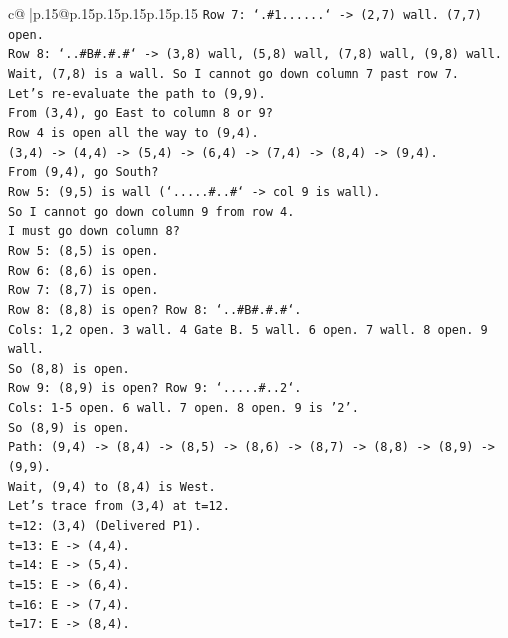 \documentclass{article}
\begin{document}
{\begin{supertabular}{c@{$\;$}|p{.15\linewidth}@{}p{.15\linewidth}p{.15\linewidth}p{.15\linewidth}p{.15\linewidth}p{.15\linewidth}}
{{{\texttt{Row 7: `.\#1......` {-}> (2,7) wall. (7,7) open.} \\
\texttt{Row 8: `..\#B\#.\#.\#` {-}> (3,8) wall, (5,8) wall, (7,8) wall, (9,8) wall.} \\
\texttt{Wait, (7,8) is a wall. So I cannot go down column 7 past row 7.} \\
\texttt{Let's re{-}evaluate the path to (9,9).} \\
\texttt{From (3,4), go East to column 8 or 9?} \\
\texttt{Row 4 is open all the way to (9,4).} \\
\texttt{(3,4) {-}> (4,4) {-}> (5,4) {-}> (6,4) {-}> (7,4) {-}> (8,4) {-}> (9,4).} \\
\texttt{From (9,4), go South?} \\
\texttt{Row 5: (9,5) is wall (`.....\#..\#` {-}> col 9 is wall).} \\
\texttt{So I cannot go down column 9 from row 4.} \\
\texttt{I must go down column 8?} \\
\texttt{Row 5: (8,5) is open.} \\
\texttt{Row 6: (8,6) is open.} \\
\texttt{Row 7: (8,7) is open.} \\
\texttt{Row 8: (8,8) is open? Row 8: `..\#B\#.\#.\#`.} \\
\texttt{Cols: 1,2 open. 3 wall. 4 Gate B. 5 wall. 6 open. 7 wall. 8 open. 9 wall.} \\
\texttt{So (8,8) is open.} \\
\texttt{Row 9: (8,9) is open? Row 9: `.....\#..2`.} \\
\texttt{Cols: 1{-}5 open. 6 wall. 7 open. 8 open. 9 is '2'.} \\
\texttt{So (8,9) is open.} \\
\texttt{Path: (9,4) {-}> (8,4) {-}> (8,5) {-}> (8,6) {-}> (8,7) {-}> (8,8) {-}> (8,9) {-}> (9,9).} \\
\texttt{Wait, (9,4) to (8,4) is West.} \\
\texttt{Let's trace from (3,4) at t=12.} \\
\texttt{t=12: (3,4) (Delivered P1).} \\
\texttt{t=13: E {-}> (4,4).} \\
\texttt{t=14: E {-}> (5,4).} \\
\texttt{t=15: E {-}> (6,4).} \\
\texttt{t=16: E {-}> (7,4).} \\
\texttt{t=17: E {-}> (8,4).} \\
}}}
\end{supertabular}}
\end{document}
